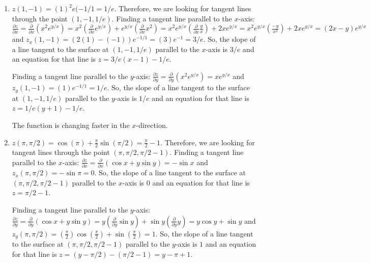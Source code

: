 \begin{Answer}[ref = tangent]
\begin{enumerate}
    \item $z(1, -1) = (1)^2e({-1/1} = 1/e$. Therefore, we are looking for 
    tangent lines through the point $(1, -1, 1/e)$. Finding a tangent line 
    parallel to the $x$-axis: $\frac{\partial z}{\partial x} = \frac{\partial}{
    \partial x} \left( x^2e^{y/x} \right) = x^2 \left( \frac{\partial}{\partial
    x}e^{y/x} \right) + e^{y/x} \left( \frac{\partial}{\partial x}x^2 \right) =
    x^2e^{y/x} \left( \frac{\partial}{\partial x} \frac{y}{x} \right) + 2x
    e^{y/x} = x^2 e^{y/x} \left( \frac{-y}{x^2} \right) + 2xe^{y/x} = \left( 
    2x - y \right)e^{y/x}$ and $z_x(1, -1) = \left( 2(1) - (-1) \right) 
    e^{-1/1} = \left(3 \right)e^{-1} = 3/e$. So, the slope of a line tangent to 
    the surface at $(1, -1, 1/e)$ parallel to the $x$-axis is $3/e$ and an 
    equation for that line is $z = 3/e \left(x - 1 \right) - 1/e$. 

    Finding a tangent line parallel to the $y$-axis: $\frac{\partial z}{
    \partial y} = \frac{\partial}{\partial y} \left( x^2e^{y/x} \right) = x
    e^{y/x}$ and $z_y(1, -1) = (1)e^{-1/1} = 1/e$. So, the slope of a line 
    tangent to the surface at $(1, -1, 1/e)$ parallel to the $y$-axis is $1/e$ 
    and an equation for that line is $z = 1/e \left(y + 1 \right) - 1/e$. 

    The function is changing faster in the $x$-direction. 

    \item $z(\pi, \pi/2) = \cos{(\pi)} + \frac{\pi}{2}\sin{(\pi/2)} = \frac{
    \pi}{2} - 1 $. Therefore, we are looking for tangent lines through the 
    point $(\pi, \pi/2, \pi/2 - 1)$. Finding a tangent line parallel to the 
    $x$-axis: $\frac{\partial z}{\partial x} = \frac{\partial}{\partial x} 
    \left( \cos{x} + y\sin{y} \right) = -\sin{x}$ and $z_x(\pi, \pi/2) = -\sin{
    \pi} = 0$. So, the slope of a line tangent to the surface at $(\pi, \pi/2, 
    \pi/2 - 1)$ parallel to the $x$-axis is $0$ and an equation for that line 
    is $z = \pi/2 - 1$.

    Finding a tangent line parallel to the $y$-axis: $\frac{\partial z}{
    \partial y} = \frac{\partial}{\partial y} \left( \cos{x} + y\sin{y} \right)
    = y \left( \frac{\partial}{\partial y}\sin{y} \right) + \sin{y} \left( 
    \frac{\partial}{\partial y} y \right) = y\cos{y} + \sin{y}$ and $z_y(\pi, 
    \pi/2) = \left( \frac{\pi}{2} \right) \cos{ \left( \frac{\pi}{2} \right) } 
    + \sin{ \left( \frac{\pi}{2} \right) } = 1$. So, the slope of a line tangent
    to the surface at $( \pi, \pi/2, \pi/2 - 1 )$ parallel to the $y$-axis is 
    $1$ and an equation for that line is $z = \left( y - \pi/2 \right) - \left(
    \pi/2 - 1 \right) = y - \pi + 1$. 


\end{enumerate}
\end{Answer}
